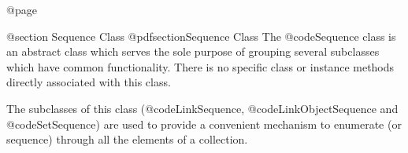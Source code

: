 @page

@section  Sequence Class
@pdfsection{Sequence Class}
The @code{Sequence} class is an abstract class which serves the
sole purpose of grouping several subclasses which have common
functionality.  There is no specific class or instance methods
directly associated with this class.

The subclasses of this class (@code{LinkSequence},
@code{LinkObjectSequence} and @code{SetSequence}) are used to provide a
convenient mechanism to enumerate (or sequence) through all the
elements of a collection.







